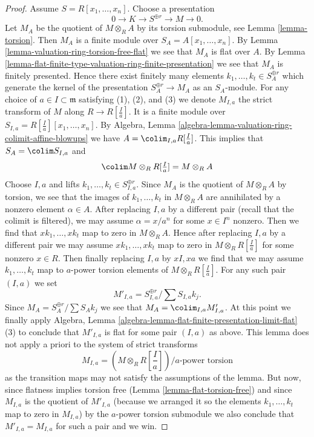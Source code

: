 \begin{proof}
\medskip\noindent
Assume $S = R[x_1, \ldots, x_n]$. Choose a presentation
$$
0 \to K \to S^{\oplus r} \to M \to 0.
$$
Let $M_A$ be the quotient of $M \otimes_R A$ by its torsion submodule, see
Lemma \ref{lemma-torsion}. Then $M_A$ is a finite module over
$S_A = A[x_1, \ldots, x_n]$. By
Lemma \ref{lemma-valuation-ring-torsion-free-flat}
we see that $M_A$ is flat over $A$. By
Lemma \ref{lemma-flat-finite-type-valuation-ring-finite-presentation}
we see that $M_A$ is finitely presented. Hence there exist finitely many
elements $k_1, \ldots, k_t \in S_A^{\oplus r}$ which generate the
kernel of the presentation $S_A^{\oplus r} \to M_A$ as
an $S_A$-module. For any choice of $a \in I \subset \mathfrak m$
satisfying (1), (2), and (3) we denote $M_{I, a}$ the strict transform of
$M$ along $R \to R[\frac{I}{a}]$. It is a finite module over
$S_{I, a} = R[\frac{I}{a}][x_1, \ldots, x_n]$. By
Algebra, Lemma \ref{algebra-lemma-valuation-ring-colimit-affine-blowups}
we have $A = \colim_{I, a} R[\frac{I}{a}]$.
This implies that $S_A = \colim S_{I, a}$ and
$$
\colim M \otimes_R R[\textstyle{\frac{I}{a}}] = M \otimes_R A
$$
Choose $I, a$ and lifts $k_1, \ldots, k_t \in S_{I, a}^{\oplus r}$.
Since $M_A$ is the quotient of $M \otimes_R A$
by torsion, we see that the images of $k_1, \ldots, k_t$ in $M \otimes_R A$
are annihilated by a nonzero element $\alpha \in A$.
After replacing $I, a$ by a different pair
(recall that the colimit is filtered),
we may assume $\alpha = x/a^n$ for some $x \in I^n$ nonzero.
Then we find that $x k_1, \ldots, x k_t$ map to zero in $M \otimes_R A$.
Hence after replacing $I, a$ by a different pair
we may assume $x k_1, \ldots, x k_t$ map to zero in
$M \otimes_R R[\frac{I}{a}]$ for some nonzero $x \in R$.
Then finally replacing $I, a$ by $xI, xa$ we find that we may assume
$k_1, \ldots, k_t$ map to $a$-power torsion elements of
$M \otimes_R R[\frac{I}{a}]$. For any such pair $(I, a)$ we set
$$
M'_{I, a} = S_{I, a}^{\oplus r}/ \sum S_{I, a}k_j.
$$
Since $M_A = S_A^{\oplus r}/ \sum S_Ak_j$ we see that
$M_A = \colim_{I, a} M'_{I, a}$. At this point we finally apply
Algebra, Lemma \ref{algebra-lemma-flat-finite-presentation-limit-flat} (3)
to conclude that $M'_{I, a}$ is flat for some pair $(I, a)$ as above.
This lemma does not apply a priori to the system of strict transforms
$$
M_{I, a} = (M \otimes_R R[\textstyle{\frac{I}{a}}])/a\text{-power torsion}
$$
as the transition maps may not satisfy the assumptions of the lemma.
But now, since flatness implies torsion free
(Lemma \ref{lemma-flat-torsion-free}) and since $M_{I, a}$
is the quotient of $M'_{I, a}$ (because we arranged it so the
elements $k_1, \ldots, k_t$ map to zero in $M_{I, a}$)
by the $a$-power torsion submodule
we also conclude that $M'_{I, a} = M_{I, a}$ for such a pair and we win.
\end{proof}

